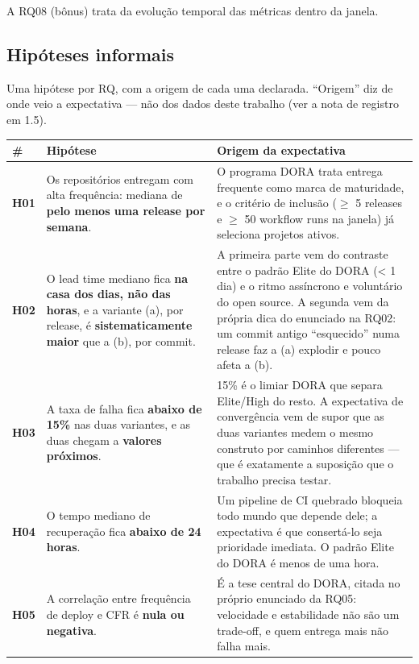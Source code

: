 \documentclass[12pt]{article}
\begin{document}
A RQ08 (bônus) trata da evolução temporal das métricas dentro da janela.

\subsection{Hipóteses informais}

Uma hipótese por RQ, com a origem de cada uma declarada. ``Origem'' diz de onde veio a expectativa — não dos dados deste trabalho (ver a nota de registro em 1.5).

\begin{table}[!htbp]
\centering
\scriptsize
\begin{tabular}{p{}p{}p{}}
\toprule
\textbf{\#} & \textbf{Hipótese} & \textbf{Origem da expectativa} \\
\midrule
\textbf{H01} & Os repositórios entregam com alta frequência: mediana de \textbf{pelo menos uma release por semana}. & O programa DORA trata entrega frequente como marca de maturidade, e o critério de inclusão ($\geq$ 5 releases e $\geq$ 50 workflow runs na janela) já seleciona projetos ativos. \\
\textbf{H02} & O lead time mediano fica \textbf{na casa dos dias, não das horas}, e a variante (a), por release, é \textbf{sistematicamente maior} que a (b), por commit. & A primeira parte vem do contraste entre o padrão Elite do DORA (< 1 dia) e o ritmo assíncrono e voluntário do open source. A segunda vem da própria dica do enunciado na RQ02: um commit antigo ``esquecido'' numa release faz a (a) explodir e pouco afeta a (b). \\
\textbf{H03} & A taxa de falha fica \textbf{abaixo de 15\%} nas duas variantes, e as duas chegam a \textbf{valores próximos}. & 15\% é o limiar DORA que separa Elite/High do resto. A expectativa de convergência vem de supor que as duas variantes medem o mesmo construto por caminhos diferentes — que é exatamente a suposição que o trabalho precisa testar. \\
\textbf{H04} & O tempo mediano de recuperação fica \textbf{abaixo de 24 horas}. & Um pipeline de CI quebrado bloqueia todo mundo que depende dele; a expectativa é que consertá-lo seja prioridade imediata. O padrão Elite do DORA é menos de uma hora. \\
\textbf{H05} & A correlação entre frequência de deploy e CFR é \textbf{nula ou negativa}. & É a tese central do DORA, citada no próprio enunciado da RQ05: velocidade e estabilidade não são um trade-off, e quem entrega mais não falha mais. \\

\end{tabular}
\end{table}
\end{document}
